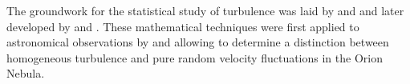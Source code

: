 


The groundwork for the statistical study of turbulence was laid by \citet{taylor1935i,taylor1935ii} and \citet{karman1937statistical} and later developed by \citet{kolm1,kolm2} and \citet{heisenberg1951stability}. 
These mathematical techniques were first applied to astronomical observations by \citet{von1951methode} and \citet{munch1958internal} allowing to determine a distinction between homogeneous turbulence and pure random velocity fluctuations in the Orion Nebula. 






